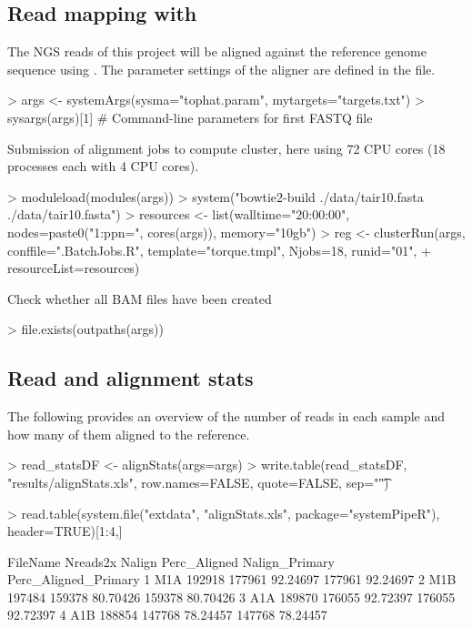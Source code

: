 \documentclass{article}
\begin{document}
\subsection{Read mapping with }
The NGS reads of this project will be aligned against the reference genome sequence using  \citep{Kim2013-vg, Langmead2012-bs}. The parameter settings of the aligner are defined in the  file.
\begin{Schunk}
\begin{Sinput}
> args <- systemArgs(sysma="tophat.param", mytargets="targets.txt")
> sysargs(args)[1] # Command-line parameters for first FASTQ file
\end{Sinput}
\end{Schunk}
Submission of alignment jobs to compute cluster, here using 72 CPU cores (18  processes each with 4 CPU cores).
\begin{Schunk}
\begin{Sinput}
> moduleload(modules(args))
> system("bowtie2-build ./data/tair10.fasta ./data/tair10.fasta")
> resources <- list(walltime="20:00:00", nodes=paste0("1:ppn=", cores(args)), memory="10gb")
> reg <- clusterRun(args, conffile=".BatchJobs.R", template="torque.tmpl", Njobs=18, runid="01", 
+                   resourceList=resources)
\end{Sinput}
\end{Schunk}
Check whether all BAM files have been created
\begin{Schunk}
\begin{Sinput}
> file.exists(outpaths(args))
\end{Sinput}
\end{Schunk}

\subsection{Read and alignment stats}
The following provides an overview of the number of reads in each sample and how many of them aligned to the reference.
\begin{Schunk}
\begin{Sinput}
> read_statsDF <- alignStats(args=args) 
> write.table(read_statsDF, "results/alignStats.xls", row.names=FALSE, quote=FALSE, sep="\t")
\end{Sinput}
\end{Schunk}
\begin{Schunk}
\begin{Sinput}
> read.table(system.file("extdata", "alignStats.xls", package="systemPipeR"), header=TRUE)[1:4,]
\end{Sinput}
\begin{Soutput}
  FileName Nreads2x Nalign Perc_Aligned Nalign_Primary Perc_Aligned_Primary
1      M1A   192918 177961     92.24697         177961             92.24697
2      M1B   197484 159378     80.70426         159378             80.70426
3      A1A   189870 176055     92.72397         176055             92.72397
4      A1B   188854 147768     78.24457         147768             78.24457
\end{Soutput}
\end{Schunk}
\end{document}
